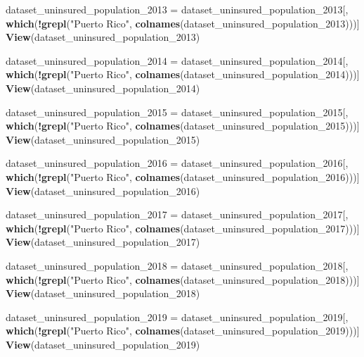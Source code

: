 \documentclass[
]{article}
\newenvironment{Shaded}{\begin{snugshade}}{\end{snugshade}}
\newcommand{\FunctionTok}[1]{\textcolor[rgb]{0.13,0.29,0.53}{\textbf{#1}}}
\newcommand{\NormalTok}[1]{#1}
\newcommand{\OtherTok}[1]{\textcolor[rgb]{0.56,0.35,0.01}{#1}}
\newcommand{\SpecialCharTok}[1]{\textcolor[rgb]{0.81,0.36,0.00}{\textbf{#1}}}
\newcommand{\StringTok}[1]{\textcolor[rgb]{0.31,0.60,0.02}{#1}}
\begin{document}
\begin{Shaded}
\begin{Highlighting}[]
\NormalTok{dataset\_uninsured\_population\_2013 }\OtherTok{=}\NormalTok{ dataset\_uninsured\_population\_2013[, }\FunctionTok{which}\NormalTok{(}\SpecialCharTok{!}\FunctionTok{grepl}\NormalTok{(}\StringTok{"Puerto Rico"}\NormalTok{, }\FunctionTok{colnames}\NormalTok{(dataset\_uninsured\_population\_2013)))]}
\FunctionTok{View}\NormalTok{(dataset\_uninsured\_population\_2013)}

\NormalTok{dataset\_uninsured\_population\_2014 }\OtherTok{=}\NormalTok{ dataset\_uninsured\_population\_2014[, }\FunctionTok{which}\NormalTok{(}\SpecialCharTok{!}\FunctionTok{grepl}\NormalTok{(}\StringTok{"Puerto Rico"}\NormalTok{, }\FunctionTok{colnames}\NormalTok{(dataset\_uninsured\_population\_2014)))]}
\FunctionTok{View}\NormalTok{(dataset\_uninsured\_population\_2014)}

\NormalTok{dataset\_uninsured\_population\_2015 }\OtherTok{=}\NormalTok{ dataset\_uninsured\_population\_2015[, }\FunctionTok{which}\NormalTok{(}\SpecialCharTok{!}\FunctionTok{grepl}\NormalTok{(}\StringTok{"Puerto Rico"}\NormalTok{, }\FunctionTok{colnames}\NormalTok{(dataset\_uninsured\_population\_2015)))]}
\FunctionTok{View}\NormalTok{(dataset\_uninsured\_population\_2015)}

\NormalTok{dataset\_uninsured\_population\_2016 }\OtherTok{=}\NormalTok{ dataset\_uninsured\_population\_2016[, }\FunctionTok{which}\NormalTok{(}\SpecialCharTok{!}\FunctionTok{grepl}\NormalTok{(}\StringTok{"Puerto Rico"}\NormalTok{, }\FunctionTok{colnames}\NormalTok{(dataset\_uninsured\_population\_2016)))]}
\FunctionTok{View}\NormalTok{(dataset\_uninsured\_population\_2016)}

\NormalTok{dataset\_uninsured\_population\_2017 }\OtherTok{=}\NormalTok{ dataset\_uninsured\_population\_2017[, }\FunctionTok{which}\NormalTok{(}\SpecialCharTok{!}\FunctionTok{grepl}\NormalTok{(}\StringTok{"Puerto Rico"}\NormalTok{, }\FunctionTok{colnames}\NormalTok{(dataset\_uninsured\_population\_2017)))]}
\FunctionTok{View}\NormalTok{(dataset\_uninsured\_population\_2017)}

\NormalTok{dataset\_uninsured\_population\_2018 }\OtherTok{=}\NormalTok{ dataset\_uninsured\_population\_2018[, }\FunctionTok{which}\NormalTok{(}\SpecialCharTok{!}\FunctionTok{grepl}\NormalTok{(}\StringTok{"Puerto Rico"}\NormalTok{, }\FunctionTok{colnames}\NormalTok{(dataset\_uninsured\_population\_2018)))]}
\FunctionTok{View}\NormalTok{(dataset\_uninsured\_population\_2018)}

\NormalTok{dataset\_uninsured\_population\_2019 }\OtherTok{=}\NormalTok{ dataset\_uninsured\_population\_2019[, }\FunctionTok{which}\NormalTok{(}\SpecialCharTok{!}\FunctionTok{grepl}\NormalTok{(}\StringTok{"Puerto Rico"}\NormalTok{, }\FunctionTok{colnames}\NormalTok{(dataset\_uninsured\_population\_2019)))]}
\FunctionTok{View}\NormalTok{(dataset\_uninsured\_population\_2019)}


\end{Highlighting}
\end{Shaded}
\end{document}
